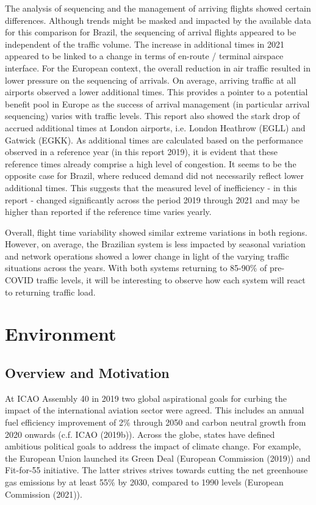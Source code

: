 \documentclass[
  a4paper,
  DIV=11,
  numbers=noendperiod]{scrreprt}
\begin{document}
The analysis of sequencing and the management of arriving flights showed
certain differences. Although trends might be masked and impacted by the
available data for this comparison for Brazil, the sequencing of arrival
flights appeared to be independent of the traffic volume. The increase
in additional times in 2021 appeared to be linked to a change in terms
of en-route / terminal airspace interface. For the European context, the
overall reduction in air traffic resulted in lower pressure on the
sequencing of arrivals. On average, arriving traffic at all airports
observed a lower additional times. This provides a pointer to a
potential benefit pool in Europe as the success of arrival management
(in particular arrival sequencing) varies with traffic levels. This
report also showed the stark drop of accrued additional times at London
airports, i.e. London Heathrow (EGLL) and Gatwick (EGKK). As additional
times are calculated based on the performance observed in a reference
year (in this report 2019), it is evident that these reference times
already comprise a high level of congestion. It seems to be the opposite
case for Brazil, where reduced demand did not necessarily reflect lower
additional times. This suggests that the measured level of inefficiency
- in this report - changed significantly across the period 2019 through
2021 and may be higher than reported if the reference time varies
yearly.

Overall, flight time variability showed similar extreme variations in
both regions. However, on average, the Brazilian system is less impacted
by seasonal variation and network operations showed a lower change in
light of the varying traffic situations across the years. With both
systems returning to 85-90\% of pre-COVID traffic levels, it will be
interesting to observe how each system will react to returning traffic
load.


\hypertarget{environment}{%
\chapter{Environment}\label{environment}}

\hypertarget{overview-and-motivation}{%
\section{Overview and Motivation}\label{overview-and-motivation}}

At ICAO Assembly 40 in 2019 two global aspirational goals for curbing
the impact of the international aviation sector were agreed. This
includes an annual fuel efficiency improvement of 2\% through 2050 and
carbon neutral growth from 2020 onwards (c.f. ICAO (2019b)). Across the
globe, states have defined ambitious political goals to address the
impact of climate change. For example, the European Union launched its
Green Deal (European Commission (2019)) and Fit-for-55 initiative. The
latter strives strives towards cutting the net greenhouse gas emissions
by at least 55\% by 2030, compared to 1990 levels (European Commission
(2021)).
\end{document}
